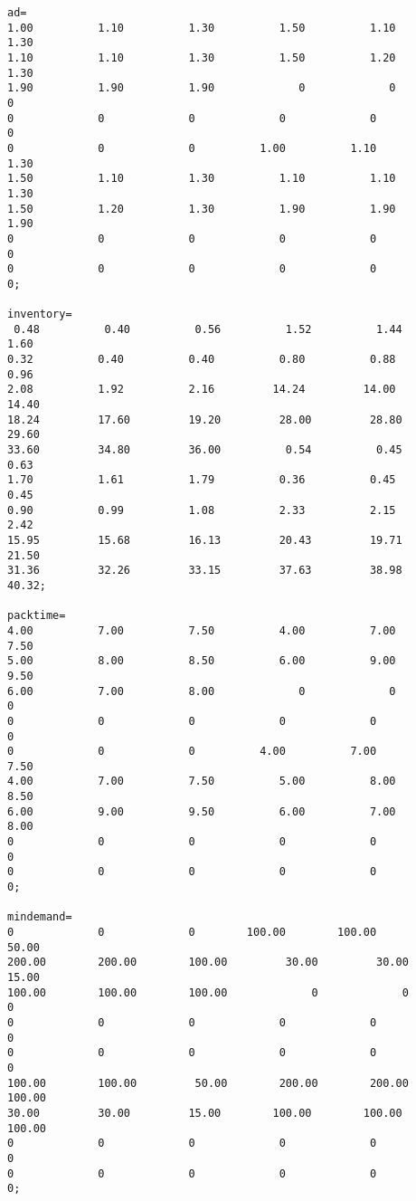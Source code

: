 \documentclass[12pt]{article}
\begin{document}
\begin{appendices}
\begin{lstlisting}
ad=
1.00          1.10          1.30          1.50          1.10          1.30
1.10          1.10          1.30          1.50          1.20          1.30
1.90          1.90          1.90             0             0             0
0             0             0             0             0             0
0             0             0          1.00          1.10          1.30
1.50          1.10          1.30          1.10          1.10          1.30
1.50          1.20          1.30          1.90          1.90          1.90
0             0             0             0             0             0
0             0             0             0             0             0;

inventory=
 0.48          0.40          0.56          1.52          1.44          1.60
0.32          0.40          0.40          0.80          0.88          0.96
2.08          1.92          2.16         14.24         14.00         14.40
18.24         17.60         19.20         28.00         28.80         29.60
33.60         34.80         36.00          0.54          0.45          0.63
1.70          1.61          1.79          0.36          0.45          0.45
0.90          0.99          1.08          2.33          2.15          2.42
15.95         15.68         16.13         20.43         19.71         21.50
31.36         32.26         33.15         37.63         38.98         40.32;

packtime=
4.00          7.00          7.50          4.00          7.00          7.50
5.00          8.00          8.50          6.00          9.00          9.50
6.00          7.00          8.00             0             0             0
0             0             0             0             0             0
0             0             0          4.00          7.00          7.50
4.00          7.00          7.50          5.00          8.00          8.50
6.00          9.00          9.50          6.00          7.00          8.00
0             0             0             0             0             0
0             0             0             0             0             0;

mindemand=
0             0             0        100.00        100.00         50.00
200.00        200.00        100.00         30.00         30.00         15.00
100.00        100.00        100.00             0             0             0
0             0             0             0             0             0
0             0             0             0             0             0
100.00        100.00         50.00        200.00        200.00        100.00
30.00         30.00         15.00        100.00        100.00        100.00
0             0             0             0             0             0
0             0             0             0             0             0;


\end{lstlisting}
\end{appendices}
\end{document}
